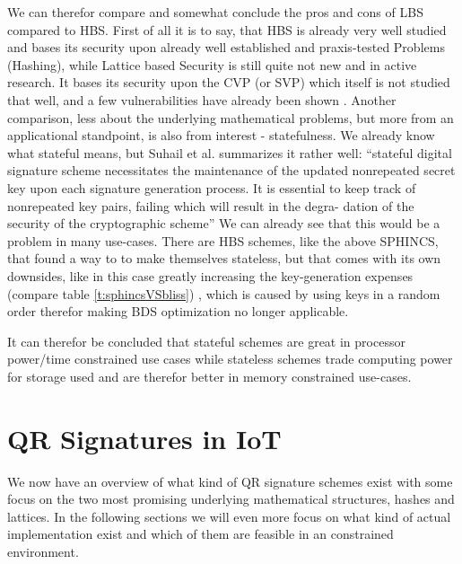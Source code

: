 \documentclass[conference]{IEEEtran}
\begin{document}
We can therefor compare and somewhat conclude the pros and cons of LBS compared to HBS.
First of all it is to say, that HBS is already very well studied and bases its security upon already well established and praxis-tested Problems (Hashing), while Lattice based Security is still quite not new and in active research. It bases its security upon the CVP (or SVP) which itself is not studied that well, and a few vulnerabilities have already been shown \cite{QR_sigs}.
Another comparison, less about the underlying mathematical problems, but more from an applicational standpoint, is also from interest - statefulness.
We already know what stateful means, but Suhail et al. summarizes it rather well: 
``stateful digital signature scheme necessitates the maintenance of the updated nonrepeated secret key upon each signature generation process. It is essential to keep track of nonrepeated key pairs, failing which will result in the degra- dation of the security of the cryptographic scheme'' 
We can already see that this would be a problem in many use-cases.
There are HBS schemes, like the above SPHINCS, that found a way to to make themselves stateless, but that comes with its own downsides, like in this case greatly increasing the key-generation expenses (compare table \ref{t:sphincsVSbliss}) , which is caused by using keys in a random order therefor making BDS optimization no longer applicable. %

It can therefor be concluded that stateful schemes are great in processor power/time constrained use cases while stateless schemes trade computing power for storage used and are therefor better in memory constrained use-cases. \cite{QR_sigs}

\section{QR Signatures in IoT}

We now have an overview of what kind of QR signature schemes exist with some focus on the two most promising underlying mathematical structures, hashes and lattices. In the following sections we will even more focus on what kind of actual implementation exist and which of them are feasible in an constrained environment.
\end{document}
